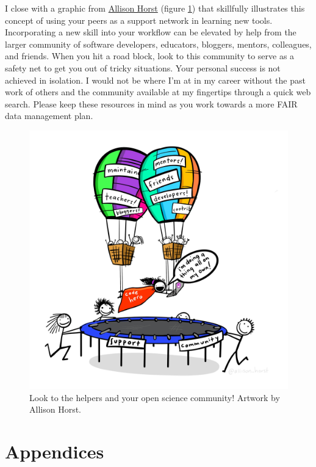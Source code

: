 \documentclass[
]{book}
\begin{document}
I close with a graphic from \href{https://twitter.com/allison_horst}{Allison Horst} (figure \ref{fig:codehero}) that skillfully illustrates this concept of using your peers as a support network in learning new tools. Incorporating a new skill into your workflow can be elevated by help from the larger community of software developers, educators, bloggers, mentors, colleagues, and friends. When you hit a road block, look to this community to serve as a safety net to get you out of tricky situations. Your personal success is not achieved in isolation. I would not be where I'm at in my career without the past work of others and the community available at my fingertips through a quick web search. Please keep these resources in mind as you work towards a more FAIR data management plan.

\begin{figure}

{\centering \includegraphics[width=1\linewidth]{img/code_hero} 

}

\caption{Look to the helpers and your open science community! Artwork by Allison Horst.}\label{fig:codehero}
\end{figure}

\hypertarget{appendices}{%
\chapter{Appendices}\label{appendices}}
\end{document}
